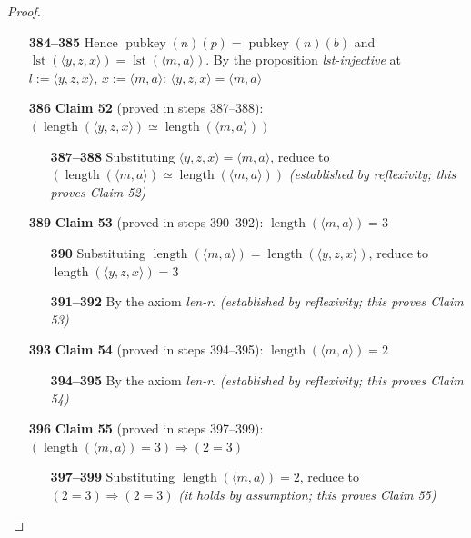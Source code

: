 \documentclass[11pt]{article}
\theoremstyle{plain}
\begin{document}
\begin{proof}
\begin{itemize}[leftmargin=2.8em, itemsep=4pt, parsep=1pt]
\begin{itemize}[leftmargin=2.8em, itemsep=4pt, parsep=1pt]
  \item[\textbf{384--385}] Hence $\operatorname{pubkey}(n)(p) = \operatorname{pubkey}(n)(b)$ and $\operatorname{lst}(\langle y, z, x \rangle) = \operatorname{lst}(\langle m, a \rangle)$. By the proposition \emph{lst-injective} at $l := \langle y, z, x \rangle$, $x := \langle m, a \rangle$: $\langle y, z, x \rangle = \langle m, a \rangle$
  \item[\textbf{386}] \textbf{Claim 52} (proved in steps 387--388): $(\operatorname{length}(\langle y, z, x \rangle) \simeq \operatorname{length}(\langle m, a \rangle))$
  \begin{itemize}[leftmargin=2.8em, itemsep=4pt, parsep=1pt]
  \item[\textbf{387--388}] Substituting $\langle y, z, x \rangle = \langle m, a \rangle$, reduce to $(\operatorname{length}(\langle m, a \rangle) \simeq \operatorname{length}(\langle m, a \rangle))$  \emph{(established by reflexivity; this proves Claim 52)}
  \end{itemize}
  \item[\textbf{389}] \textbf{Claim 53} (proved in steps 390--392): $\operatorname{length}(\langle m, a \rangle) = 3$
  \begin{itemize}[leftmargin=2.8em, itemsep=4pt, parsep=1pt]
  \item[\textbf{390}] Substituting $\operatorname{length}(\langle m, a \rangle) = \operatorname{length}(\langle y, z, x \rangle)$, reduce to $\operatorname{length}(\langle y, z, x \rangle) = 3$
  \item[\textbf{391--392}] By the axiom \emph{len-r}.  \emph{(established by reflexivity; this proves Claim 53)}
  \end{itemize}
  \item[\textbf{393}] \textbf{Claim 54} (proved in steps 394--395): $\operatorname{length}(\langle m, a \rangle) = 2$
  \begin{itemize}[leftmargin=2.8em, itemsep=4pt, parsep=1pt]
  \item[\textbf{394--395}] By the axiom \emph{len-r}.  \emph{(established by reflexivity; this proves Claim 54)}
  \end{itemize}
  \item[\textbf{396}] \textbf{Claim 55} (proved in steps 397--399): $(\operatorname{length}(\langle m, a \rangle) = 3) \Rightarrow (2 = 3)$
  \begin{itemize}[leftmargin=2.8em, itemsep=4pt, parsep=1pt]
  \item[\textbf{397--399}] Substituting $\operatorname{length}(\langle m, a \rangle) = 2$, reduce to $(2 = 3) \Rightarrow (2 = 3)$  \emph{(it holds by assumption; this proves Claim 55)}

\end{itemize}
\end{itemize}
\end{itemize}
\end{proof}
\end{document}
